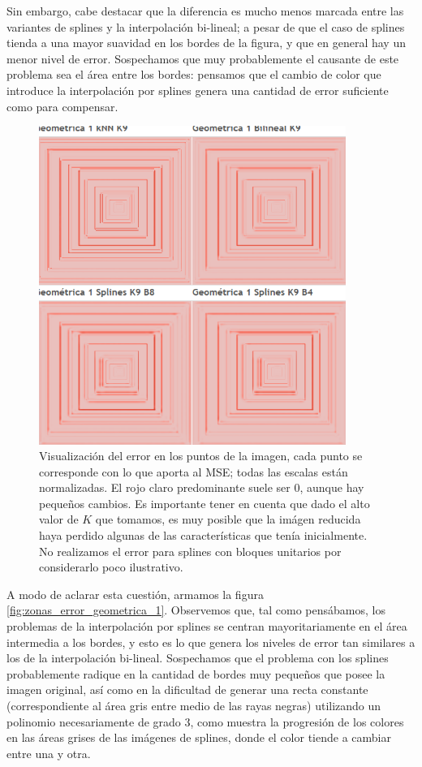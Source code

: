 \documentclass{article}
\begin{document}
Sin embargo, cabe destacar que la diferencia es mucho menos marcada entre las variantes de splines y la interpolación bi-lineal; a pesar de que el caso de splines tienda a una mayor suavidad en los bordes de la figura, y que en general hay un menor nivel de error. Sospechamos que muy probablemente el causante de este problema sea el área entre los bordes: pensamos que el cambio de color que introduce la interpolación por splines genera una cantidad de error suficiente como para compensar.

\begin{figure}[H]
\centering
\includegraphics[width=10cm]{Error Geometrica 1}
\caption{Visualización del error en los puntos de la imagen, cada punto se corresponde con lo que aporta al MSE; todas las escalas están normalizadas. El rojo claro predominante suele ser 0, aunque hay pequeños cambios. Es importante tener en cuenta que dado el alto valor de $K$ que tomamos, es muy posible que la imágen reducida haya perdido algunas de las características que tenía inicialmente. No realizamos el error para splines con bloques unitarios por considerarlo poco ilustrativo.}
\label{fig:error_geometrica_1}
\end{figure}

A modo de aclarar esta cuestión, armamos la figura \ref{fig:zonas_error_geometrica_1}. Observemos que, tal como pensábamos, los problemas de la interpolación por splines se centran mayoritariamente en el área intermedia a los bordes, y esto es lo que genera los niveles de error tan similares a los de la interpolación bi-lineal. Sospechamos que el problema con los splines probablemente radique en la cantidad de bordes muy pequeños que posee la imagen original, así como en la dificultad de generar una recta constante (correspondiente al área gris entre medio de las rayas negras) utilizando un polinomio necesariamente de grado 3, como muestra la progresión de los colores en las áreas grises de las imágenes de splines, donde el color tiende a cambiar entre una y otra.
\end{document}
